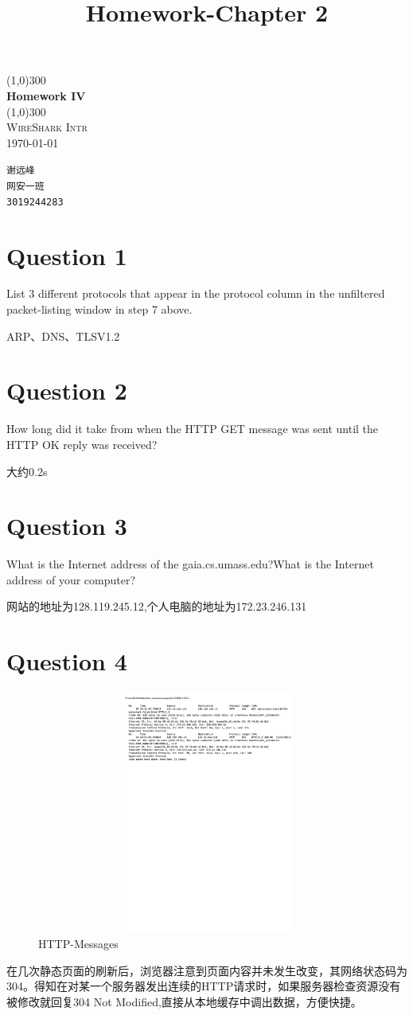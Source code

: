 \documentclass[UTF8]{article}
\title{Homework-Chapter 2}
\begin{document}
\begin{titlepage}
    \begin{center}
        \line(1,0){300}\\
        [0.65cm]
        \huge{\bfseries Homework IV }\\
        \line(1,0){300}\\
        \textsc{\Large WireShark Intr}\\
        \textnormal{\Large \today}\\
        [5.5cm]
    \end{center}
    \begin{flushright}
        \texttt{\Large 谢远峰\\网安一班\\3019244283}\\
        [0.5cm]
    \end{flushright}
\end{titlepage}
\clearpage
\section*{Question 1}
List 3 different protocols that appear in the protocol column in the unfiltered packet-listing window in step 7 above. \par
ARP、DNS、TLSV1.2\par
\section*{Question 2}
How long did it take from when the HTTP GET message was sent until the HTTP OK reply was received?\par
大约0.2s\par
\section*{Question 3}
What is the Internet address of the gaia.cs.umass.edu?What is the Internet address of your computer?\par
网站的地址为128.119.245.12,个人电脑的地址为172.23.246.131\par
\section*{Question 4}
\begin{figure}[h]
    \centering
    \includegraphics[width=16cm,height=8cm]{capture.pdf}
    \caption{HTTP-Messages}
\end{figure}
在几次静态页面的刷新后，浏览器注意到页面内容并未发生改变，其网络状态码为304。得知在对某一个服务器发出连续的HTTP请求时，如果服务器检查资源没有被修改就回复304 Not Modified,直接从本地缓存中调出数据，方便快捷。
\end{document}
